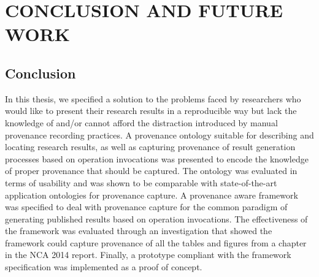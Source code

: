 \chapter{CONCLUSION AND FUTURE WORK}
\label{future-work}

\section{Conclusion}
In this thesis, we specified a solution to the problems faced by researchers who would like to present their research results in a reproducible way but lack the knowledge of and/or cannot afford the distraction introduced by manual provenance recording practices. A provenance ontology suitable for describing and locating research results, as well as capturing provenance of result generation processes based on operation invocations was presented to encode the knowledge of proper provenance that should be captured. The ontology was evaluated in terms of usability and was shown to be comparable with state-of-the-art application ontologies for provenance capture. A provenance aware framework was specified to deal with provenance capture for the common paradigm of generating published results based on operation invocations. The effectiveness of the framework was evaluated through an investigation that showed the framework could capture provenance of all the tables and figures from a chapter in the NCA 2014 report. Finally, a prototype compliant with the framework specification was implemented as a proof of concept.

